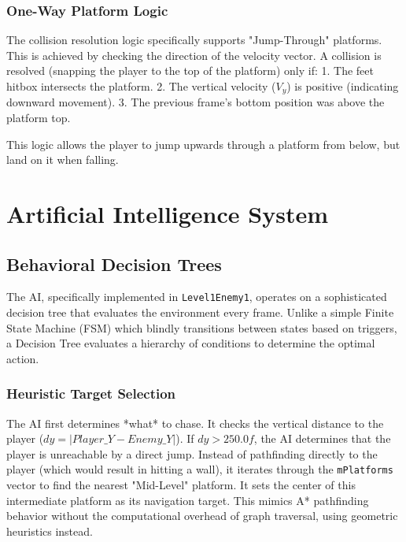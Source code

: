 \documentclass[10pt, a4paper]{article}
\begin{document}
\subsubsection{One-Way Platform Logic}
The collision resolution logic specifically supports "Jump-Through" platforms. This is achieved by checking the direction of the velocity vector. A collision is resolved (snapping the player to the top of the platform) only if:
1. The feet hitbox intersects the platform.
2. The vertical velocity ($V_y$) is positive (indicating downward movement).
3. The previous frame's bottom position was above the platform top.

This logic allows the player to jump upwards through a platform from below, but land on it when falling.

\newpage

\section{Artificial Intelligence System}

\subsection{Behavioral Decision Trees}
The AI, specifically implemented in \texttt{Level1Enemy1}, operates on a sophisticated decision tree that evaluates the environment every frame. Unlike a simple Finite State Machine (FSM) which blindly transitions between states based on triggers, a Decision Tree evaluates a hierarchy of conditions to determine the optimal action.

\subsubsection{Heuristic Target Selection}
The AI first determines *what* to chase. It checks the vertical distance to the player ($dy = |Player\_Y - Enemy\_Y|$). If $dy > 250.0f$, the AI determines that the player is unreachable by a direct jump. Instead of pathfinding directly to the player (which would result in hitting a wall), it iterates through the \texttt{mPlatforms} vector to find the nearest "Mid-Level" platform. It sets the center of this intermediate platform as its navigation target. This mimics A* pathfinding behavior without the computational overhead of graph traversal, using geometric heuristics instead.
\end{document}
